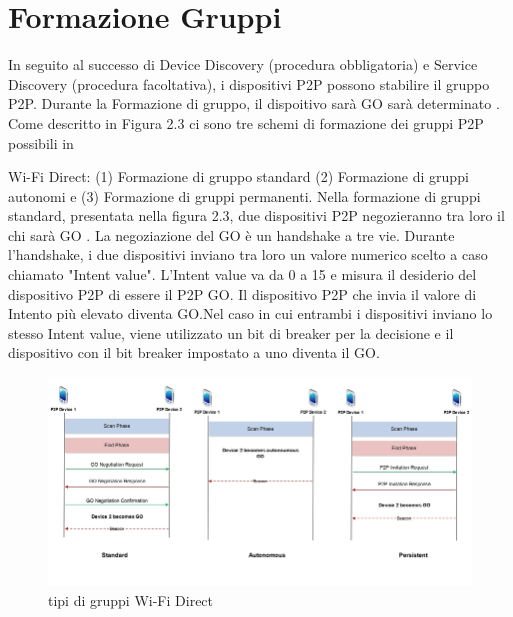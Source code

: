 \section{Formazione Gruppi}

In seguito al successo di Device Discovery (procedura obbligatoria) e
Service Discovery (procedura facoltativa), i dispositivi P2P  possono
stabilire il gruppo P2P. Durante la Formazione di gruppo, il dispoitivo
sarà GO sarà determinato . Come descritto in Figura 2.3 ci sono 
tre schemi di formazione dei gruppi P2P possibili in

Wi-Fi Direct: (1) Formazione di gruppo standard (2) Formazione di 
gruppi autonomi e (3) Formazione di gruppi permanenti. Nella formazione 
di gruppi standard, presentata nella figura 2.3,  due dispositivi P2P
negozieranno
tra loro il chi sarà GO . La negoziazione del GO è un handshake a 
tre vie. Durante l'handshake, i due dispositivi inviano tra loro un valore
numerico scelto a caso chiamato "Intent value". L'Intent value
va da 0 a 15 e misura il desiderio del dispositivo P2P di essere il P2P 
GO. Il dispositivo P2P che invia il valore di Intento più elevato 
diventa GO.Nel caso in cui entrambi i dispositivi inviano
lo stesso Intent value, viene utilizzato 
un bit di breaker per la decisione e il dispositivo con il bit breaker   
impostato a uno diventa il GO.

\begin{figure}
\caption{tipi di gruppi Wi-Fi Direct}
\includegraphics[width=1\columnwidth]{imgs/wifiGroup.jpg} %
\end{figure}


